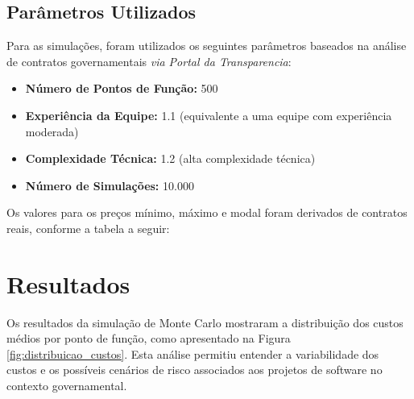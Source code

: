 \documentclass[12pt]{article}
\begin{document}
\subsection{Parâmetros Utilizados}

Para as simulações, foram utilizados os seguintes parâmetros baseados na análise de contratos governamentais \textit{via Portal da Transparencia}\cite{portal}:

\begin{itemize}
    \item \textbf{Número de Pontos de Função:} 500
    \item \textbf{Experiência da Equipe:} 1.1 (equivalente a uma equipe com experiência moderada)
    \item \textbf{Complexidade Técnica:} 1.2 (alta complexidade técnica)
    \item \textbf{Número de Simulações:} 10.000
\end{itemize}

Os valores para os preços mínimo, máximo e modal foram derivados de contratos reais, conforme a tabela a seguir:

\begin{table}[H]
\centering
\caption{Estimativas de Custos por Tipo de Desenvolvimento}
\label{tab:precos}
\end{table}

\section{Resultados}

Os resultados da simulação de Monte Carlo mostraram a distribuição dos custos médios por ponto de função, como apresentado na Figura \ref{fig:distribuicao_custos}. Esta análise permitiu entender a variabilidade dos custos e os possíveis cenários de risco associados aos projetos de software no contexto governamental.
\end{document}
